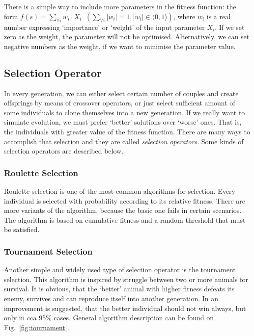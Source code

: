 There is a simple way to include more parameters in the fitness function: the form $ f(s) = \sum_{\forall i} w_i \cdot X_i \; \; (\sum_{\forall i} |w_i| = 1, |w_i| \in \langle 0,1 \rangle) $, where $ w_i $ is a real number expressing `importance' or `weight' of the input parameter $ X_i $. If we set zero as the weight, the parameter will not be optimised. Alternatively, we can set negative numbers as the weight, if we want to minimise the parameter value.

\subsection{Selection Operator}

In every generation, we can either select certain number of couples and create offsprings by means of crossover operators, or just select sufficient amount of some individuals to clone themselves into a new generation. If we really want to simulate evolution, we must prefer `better' solutions over `worse' ones. That is, the individuals with greater value of the fitness function. There are many ways to accomplish that selection and they are called {\em selection operators}. Some kinds of selection operators are described below.

\subsubsection{Roulette Selection}

Roulette selection is one of the most common algorithms for selection. Every individual is selected with probability according to its relative fitness. There are more variants of the algorithm, because the basic one fails in certain scenarios. The algorithm is based on cumulative fitness and a random threshold that must be satisfied.

\subsubsection{Tournament Selection}

Another simple and widely used type of selection operator is the tournament selection. This algorithm is inspired by struggle between two or more animals for survival. It is obvious, that the `better' animal with higher fitness defeats its enemy, survives and can reproduce itself into another generation. In \cite{tournament} an improvement is suggested, that the better individual should not win always, but only in cca 95\% cases. General algorithm description can be found on Fig.~\ref{fig:tournament}.

